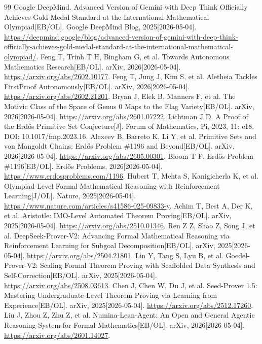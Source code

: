 \begin{thebibliography}{99}
 Google DeepMind. Advanced Version of Gemini with Deep Think Officially Achieves Gold-Medal Standard at the International Mathematical Olympiad[EB/OL]. Google DeepMind Blog, 2025[2026-05-04]. \url{https://deepmind.google/blog/advanced-version-of-gemini-with-deep-think-officially-achieves-gold-medal-standard-at-the-international-mathematical-olympiad/}.
 Feng T, Trinh T H, Bingham G, et al. Towards Autonomous Mathematics Research[EB/OL]. arXiv, 2026[2026-05-04]. \url{https://arxiv.org/abs/2602.10177}.
 Feng T, Jung J, Kim S, et al. Aletheia Tackles FirstProof Autonomously[EB/OL]. arXiv, 2026[2026-05-04]. \url{https://arxiv.org/abs/2602.21201}.
 Bryan J, Elek B, Manners F, et al. The Motivic Class of the Space of Genus 0 Maps to the Flag Variety[EB/OL]. arXiv, 2026[2026-05-04]. \url{https://arxiv.org/abs/2601.07222}.
 Lichtman J D. A Proof of the Erdős Primitive Set Conjecture[J]. Forum of Mathematics, Pi, 2023, 11: e18. DOI: 10.1017/fmp.2023.16.
 Alexeev B, Barreto K, Li Y, et al. Primitive Sets and von Mangoldt Chains: Erdős Problem \#1196 and Beyond[EB/OL]. arXiv, 2026[2026-05-04]. \url{https://arxiv.org/abs/2605.00301}.
 Bloom T F. Erdős Problem \#1196[EB/OL]. Erdős Problems, 2026[2026-05-04]. \url{https://www.erdosproblems.com/1196}.
 Hubert T, Mehta S, Kanigicherla K, et al. Olympiad-Level Formal Mathematical Reasoning with Reinforcement Learning[J/OL]. Nature, 2025[2026-05-04]. \url{https://www.nature.com/articles/s41586-025-09833-y}.
 Achim T, Best A, Der K, et al. Aristotle: IMO-Level Automated Theorem Proving[EB/OL]. arXiv, 2025[2026-05-04]. \url{https://arxiv.org/abs/2510.01346}.
 Ren Z Z, Shao Z, Song J, et al. DeepSeek-Prover-V2: Advancing Formal Mathematical Reasoning via Reinforcement Learning for Subgoal Decomposition[EB/OL]. arXiv, 2025[2026-05-04]. \url{https://arxiv.org/abs/2504.21801}.
 Lin Y, Tang S, Lyu B, et al. Goedel-Prover-V2: Scaling Formal Theorem Proving with Scaffolded Data Synthesis and Self-Correction[EB/OL]. arXiv, 2025[2026-05-04]. \url{https://arxiv.org/abs/2508.03613}.
 Chen J, Chen W, Du J, et al. Seed-Prover 1.5: Mastering Undergraduate-Level Theorem Proving via Learning from Experience[EB/OL]. arXiv, 2025[2026-05-04]. \url{https://arxiv.org/abs/2512.17260}.
 Liu J, Zhou Z, Zhu Z, et al. Numina-Lean-Agent: An Open and General Agentic Reasoning System for Formal Mathematics[EB/OL]. arXiv, 2026[2026-05-04]. \url{https://arxiv.org/abs/2601.14027}.

\end{thebibliography}
